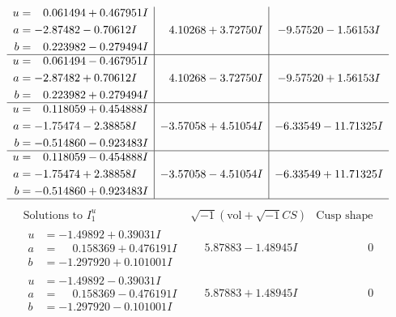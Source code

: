 \documentclass[1p]{elsarticle_modified}
\theoremstyle{definition}
\newcommand{\I}{\sqrt{-1}}
\begin{document}
$$\begin{array}{c|c|c}
\begin{aligned}
u &= \phantom{-}0.061494 + 0.467951 I \\
a &= -2.87482 - 0.70612 I \\
b &= \phantom{-}0.223982 - 0.279494 I\end{aligned}
 & \phantom{-}4.10268 + 3.72750 I & -9.57520 - 1.56153 I \\ \hline\begin{aligned}
u &= \phantom{-}0.061494 - 0.467951 I \\
a &= -2.87482 + 0.70612 I \\
b &= \phantom{-}0.223982 + 0.279494 I\end{aligned}
 & \phantom{-}4.10268 - 3.72750 I & -9.57520 + 1.56153 I \\ \hline\begin{aligned}
u &= \phantom{-}0.118059 + 0.454888 I \\
a &= -1.75474 - 2.38858 I \\
b &= -0.514860 - 0.923483 I\end{aligned}
 & -3.57058 + 4.51054 I & -6.33549 - 11.71325 I \\ \hline\begin{aligned}
u &= \phantom{-}0.118059 - 0.454888 I \\
a &= -1.75474 + 2.38858 I \\
b &= -0.514860 + 0.923483 I\end{aligned}
 & -3.57058 - 4.51054 I & -6.33549 + 11.71325 I\\
 \hline 
 \end{array}$$\newpage$$\begin{array}{c|c|c}  
\text{Solutions to }I^u_{1}& \I (\text{vol} + \sqrt{-1}CS) & \text{Cusp shape}\\
 \hline 
\begin{aligned}
u &= -1.49892 + 0.39031 I \\
a &= \phantom{-}0.158369 + 0.476191 I \\
b &= -1.297920 + 0.101001 I\end{aligned}
 & \phantom{-}5.87883 - 1.48945 I & \phantom{-0.000000 } 0 \\ \hline\begin{aligned}
u &= -1.49892 - 0.39031 I \\
a &= \phantom{-}0.158369 - 0.476191 I \\
b &= -1.297920 - 0.101001 I\end{aligned}
 & \phantom{-}5.87883 + 1.48945 I & \phantom{-0.000000 } 0 \\ \hline\begin{aligned}

\end{aligned}
\end{array}$$
\end{document}
